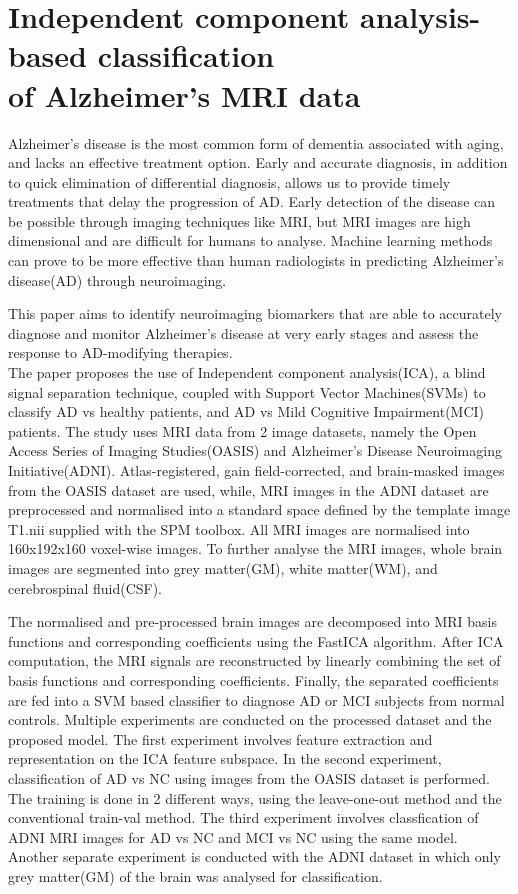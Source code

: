 \documentclass[11pt]{article}
\begin{document}
  \section*{Independent component analysis-based classification \\of Alzheimer's MRI data}
  Alzheimer’s disease is the most common form of dementia associated with aging, and lacks an effective treatment option. Early and accurate diagnosis, in addition to quick elimination of differential diagnosis, allows us to provide timely treatments that delay the progression of AD. Early detection of the disease can be possible through imaging techniques like MRI, but MRI images are high dimensional and are difficult for humans to analyse. Machine learning methods can prove to be more effective than human radiologists in predicting Alzheimer’s disease(AD) through neuroimaging.

  This paper aims to identify neuroimaging biomarkers that are able to accurately diagnose and monitor Alzheimer’s disease at very early stages and assess the response to AD-modifying therapies.\\

  The paper proposes the use of Independent component analysis(ICA), a blind signal separation technique, coupled with Support Vector Machines(SVMs) to classify AD vs healthy patients, and AD vs Mild Cognitive Impairment(MCI) patients.
  The study uses MRI data from 2 image datasets, namely the Open Access Series of Imaging Studies(OASIS) and Alzheimer’s Disease Neuroimaging Initiative(ADNI).
  Atlas-registered, gain field-corrected, and brain-masked images from the OASIS dataset are used, while,
  MRI images in the ADNI dataset are preprocessed and normalised into a standard space defined by the template image T1.nii supplied with the SPM toolbox.
  All MRI images are normalised into 160x192x160 voxel-wise images.
  To further analyse the MRI images, whole brain images are segmented into grey matter(GM), white matter(WM), and cerebrospinal fluid(CSF).

  The normalised and pre-processed brain images are decomposed into MRI basis functions and corresponding coefficients using the FastICA algorithm. 
  After ICA computation, the MRI signals are reconstructed by linearly combining the set of basis functions and corresponding coefficients.
  Finally, the separated coefficients are fed into a SVM based classifier to diagnose AD or MCI subjects from normal controls.
  Multiple experiments are conducted on the processed dataset and the proposed model.
  The first experiment involves feature extraction and representation on the ICA feature subspace.
  In the second experiment, classification of AD vs NC using images from the OASIS dataset is performed. The training is done in 2 different ways, using the leave-one-out method and the conventional train-val method.
  The third experiment involves classfication of ADNI MRI images for AD vs NC and MCI vs NC using the same model.
  Another separate experiment is conducted with the ADNI dataset in which only grey matter(GM) of the brain was analysed for classification.\\
\end{document}
